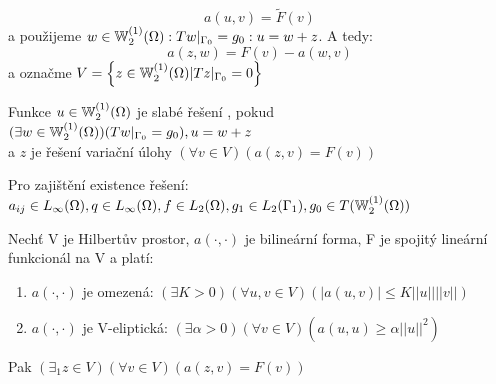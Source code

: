 \documentclass[../main.tex]{subfiles}
\begin{document}
\begin{equation*}
    a(u,v) = \tilde{F}(v)
\end{equation*}
a použijeme $w \in \mathbb{W}_2^{(1)}(\Omega): Tw|_{\Gamma_0} = g_0: u = w + z$. A tedy: 
\begin{equation*}
    a(z,w) = F(v) - a(w,v)
\end{equation*}
a označme $V = \left\{ z\in\mathbb{W}_2^{(1)}(\Omega) | Tz|_{\Gamma_0} = 0 \right\}$




\begin{theorem}
    Funkce $u\in\mathbb{W}_2^{(1)}(\Omega)$ je slabé řešení , pokud \\ $(\exists w\in\mathbb{W}_2^{(1)}(\Omega))(T w|_{\Gamma_0}= g_0), u = w + z$ \\ a $z$ je řešení variační úlohy $(\forall v \in V)(a(z,v) = F(v))$
\end{theorem}


\begin{remark}
    Pro zajištění existence řešení: \\ $a_{ij} \in L_\infty(\Omega), q\in L_\infty(\Omega), f\in L_2(\Omega), g_1 \in L_2(\Gamma_1), g_0\in T(\mathbb{W}_2^{(1)}(\Omega))$
\end{remark}

\begin{theorem}
    Nechť V je Hilbertův prostor, $a(\cdot, \cdot)$ je bilineární forma, F je spojitý lineární funkcionál na V a platí:
    \begin{enumerate}
        \item $a(\cdot, \cdot)$ je omezená: $(\exists K>0)(\forall u,v \in V)(|a(u,v)|\leq K ||u|| ||v||)$
        \item $a(\cdot, \cdot)$ je V-eliptická: $(\exists\alpha>0)(\forall v \in V)(a(u,u)\geq \alpha||u||^2)$
    \end{enumerate}
    Pak $(\exists_1z\in V)(\forall v \in V)(a(z,v) = F(v))$
\end{theorem}
\end{document}
